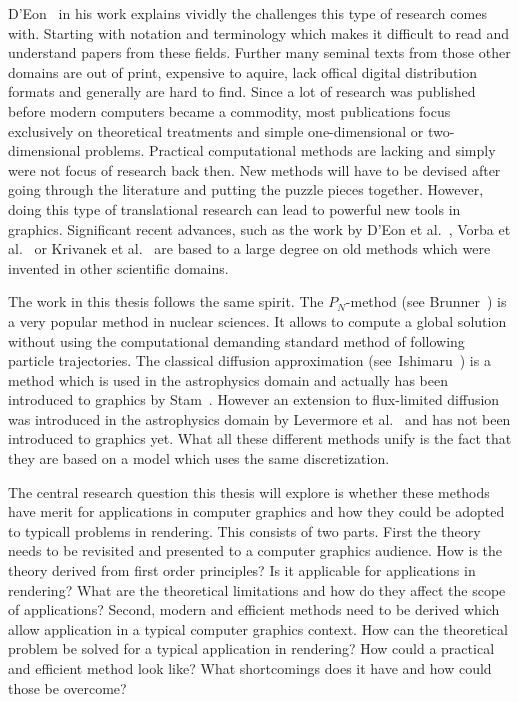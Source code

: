 D'Eon~\cite{DEon14} in his work explains vividly the challenges this type of research comes with. Starting with notation and terminology which makes it difficult to read and understand papers from these fields. Further many seminal texts from those other domains are out of print, expensive to aquire, lack offical digital distribution formats and generally are hard to find. Since a lot of research was published before modern computers became a commodity, most publications focus exclusively on theoretical treatments and simple one-dimensional or two-dimensional problems. Practical computational methods are lacking and simply were not focus of research back then. New methods will have to be devised after going through the literature and putting the puzzle pieces together. However, doing this type of translational research can lead to powerful new tools in graphics. Significant recent advances, such as the work by D'Eon et al.~\cite{dEon11}, Vorba et al.~\cite{Vorba16} or Krivanek et al.~\cite{Krivanek14} are based to a large degree on old methods which were invented in other scientific domains.

The work in this thesis follows the same spirit. The $P_N$-method (see Brunner~\cite{Brunner02}) is a very popular method in nuclear sciences. It allows to compute a global solution without using the computational demanding standard method of following particle trajectories. The classical diffusion approximation (see~Ishimaru~\cite{Ishimaru78}) is a method which is used in the astrophysics domain and actually has been introduced to graphics by Stam~\cite{Stam95}. However an extension to flux-limited diffusion was introduced in the astrophysics domain by Levermore et al.~\cite{Levermore81} and has not been introduced to graphics yet. What all these different methods unify is the fact that they are based on a model which uses the same discretization.

The central research question this thesis will explore is whether these methods have merit for applications in computer graphics and how they could be adopted to typicall problems in rendering. This consists of two parts. First the theory needs to be revisited and presented to a computer graphics audience. How is the theory derived from first order principles? Is it applicable for applications in rendering? What are the theoretical limitations and how do they affect the scope of applications? Second, modern and efficient methods need to be derived which allow application in a typical computer graphics context. How can the theoretical problem be solved for a typical application in rendering? How could a practical and efficient method look like? What shortcomings does it have and how could those be overcome?

